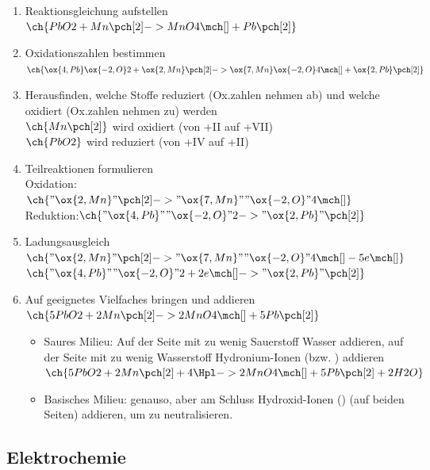 \documentclass[12pt,a4paper]{article}
\renewcommand{\=}[1]{\stackrel{#1}{=}}
\theoremstyle{definition}
\theoremstyle{remark}
\begin{document}
\begin{enumerate}
\item Reaktionsgleichung aufstellen\\
$\ch{PbO2 + Mn\pch[2] -> MnO4\mch[] + Pb\pch[2]}$
\item Oxidationszahlen bestimmen\\
$\ch{\ox{4,Pb} \ox{-2,O} 2 + \ox{2,Mn} \pch[2] -> \ox{7,Mn} \ox{-2,O} 4\mch[] + \ox{2,Pb} \pch[2]} $
\item Herausfinden, welche Stoffe reduziert (Ox.zahlen nehmen ab) und welche oxidiert (Ox.zahlen nehmen zu) werden\\
$\ch{Mn\pch[2]}$ wird oxidiert (von +II auf +VII)\\
$\ch{PbO2}$ wird reduziert (von +IV auf +II)
\item Teilreaktionen formulieren\\
Oxidation: $\ch{"\ox{2,Mn}" \pch[2] -> "\ox{7,Mn}" "\ox{-2,O}" 4\mch[]}$\\
Reduktion:$ \ch{"\ox{4,Pb}" "\ox{-2,O}" 2 -> "\ox{2,Pb}" \pch[2]}$
\item Ladungsausgleich\\
$\ch{"\ox{2,Mn}" \pch[2] -> "\ox{7,Mn}" "\ox{-2,O}" 4\mch[] - 5 e\mch[]}$\\
$\ch{"\ox{4,Pb}" "\ox{-2,O}" 2 + 2 e\mch[] -> "\ox{2,Pb}" \pch[2]}$
\item Auf geeignetes Vielfaches bringen und addieren\\
$\ch{5 PbO2 + 2 Mn\pch[2] -> 2 MnO4\mch[] + 5 Pb\pch[2]}$
\begin{itemize}
	\item Saures Milieu: Auf der Seite mit zu wenig Sauerstoff Wasser addieren, auf der Seite mit zu wenig Wasserstoff Hydronium-Ionen (bzw. \Hpl ) addieren\\
	$\ch{5 PbO2 + 2 Mn\pch[2] + 4 \Hpl -> 2 MnO4\mch[] + 5 Pb\pch[2] + 2 H2O}$
	\item Basisches Milieu: genauso, aber am Schluss Hydroxid-Ionen (\Hyd) (auf beiden Seiten) addieren, um \Hpl zu neutralisieren.
\end{itemize}
\end{enumerate}

\subsection{Elektrochemie}
\end{document}
